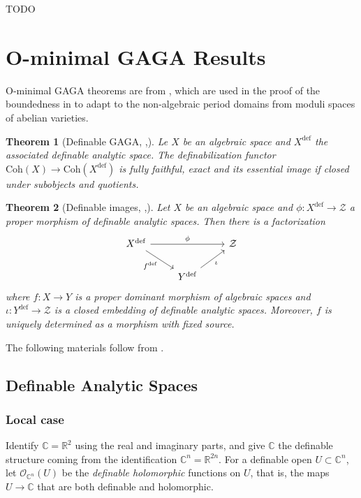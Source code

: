 \documentclass{amsart}
\newtheorem{theorem}{Theorem}[subsection]
\theoremstyle{definition}
\numberwithin{equation}{section}
\newcommand{\definable}{\mathrm{def}}
\begin{document}
TODO

\section{O-minimal GAGA Results}
O-minimal GAGA theorems are from \cite{zbMATH07662555},
which are used in the proof of the boundedness in \cite{arXiv:2507.00973,arXiv:2508.19215}
to adapt to the non-algebraic period domains from moduli spaces of abelian varieties.

\begin{tcolorbox}[title = {\bfseries\Large Main results}]
  \begin{theorem}[{Definable GAGA, \cite[Theorem 2.1]{arXiv:2508.19215},\cite[Theorem 1.4]{zbMATH07662555}}]
    Le $X$ be an algebraic space and $X^{\definable}$ the associated definable analytic space.
    The definabilization functor $\mathrm{Coh}(X) \to \mathrm{Coh}(X^{\definable})$ is fully faithful, exact and
    its essential image if closed under subobjects and quotients.
  \end{theorem}

  \begin{theorem}[{Definable images, \cite[Theorem 2.2]{arXiv:2508.19215},\cite[Theorem 1.3]{zbMATH07662555}}]
    \label{def image}
    Let $X$ be an algebraic space and
    $\phi: X^{\definable} \to \mathcal{Z}$ a proper morphism of definable analytic spaces.
    Then there is a factorization
    \[\begin{tikzcd}
      X^{\definable}\ar[rr,"\phi"]\ar[dr,"f^{\definable}"'] & & \mathcal{Z} \\
                                                            & Y^{\definable}\ar[ur,"\iota"'] &
    \end{tikzcd}\]
    where $f: X\to Y$ is a proper dominant morphism of algebraic spaces and
    $\iota: Y^{\definable} \to \mathcal{Z}$ is a closed embedding of definable analytic spaces.
    Moreover, $f$ is uniquely determined as a morphism with fixed source.
  \end{theorem}
\end{tcolorbox}

The following materials follow from \cite{zbMATH07662555}.

\subsection{Definable Analytic Spaces}
\subsubsection{Local case}
Identify $\mathbb{C} = \mathbb{R}^2$ using the real and imaginary parts,
and give $\mathbb{C}$ the definable structure coming from the identification $\mathbb{C}^n = \mathbb{R}^{2n}$.
For a definable open $U \subset \mathbb{C}^n$,
let $\mathcal{O}_{\mathbb{C}^n}(U)$ be the \emph{definable holomorphic} functions on $U$,
that is, the maps $U \to \mathbb{C}$ that are both definable and holomorphic.
\end{document}
